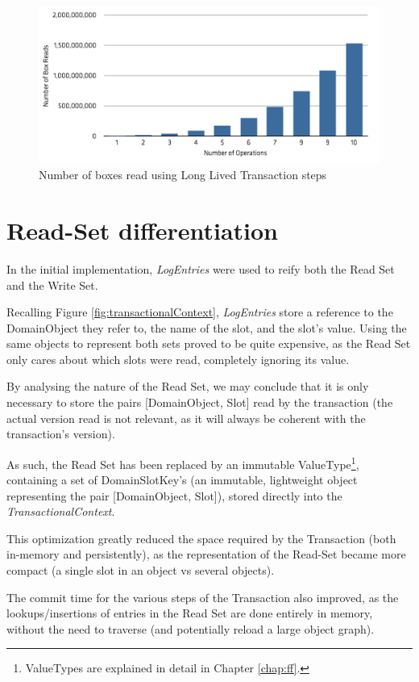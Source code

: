 \begin{figure}
\centering
\includegraphics[width=0.9\linewidth]{box-long-v1}
\caption{Number of boxes read using Long Lived Transaction steps}
\label{fig:long-box-v1}
\end{figure}

\section{Read-Set differentiation}

In the initial implementation, {\it LogEntries} were used to reify
both the Read Set and the Write Set.

Recalling Figure \ref{fig:transactionalContext}, {\it LogEntries} store a
reference to the DomainObject they refer to, the name of the slot, and
the slot's value. Using the same objects to represent both sets proved
to be quite expensive, as the Read Set only cares about which slots
were read, completely ignoring its value.

By analysing the nature of the Read Set, we may conclude that it is
only necessary to store the pairs [DomainObject, Slot] read by the
transaction (the actual version read is not relevant, as it will
always be coherent with the transaction's version).

As such, the Read Set has been replaced by an immutable
ValueType\footnote{ValueTypes are explained in detail in Chapter
  \ref{chap:ff}.}, containing a set of DomainSlotKey's (an immutable,
lightweight object representing the pair [DomainObject, Slot]), stored
directly into the {\it TransactionalContext}.

This optimization greatly reduced the space required by the
Transaction (both in-memory and persistently), as the representation
of the Read-Set became more compact (a single slot in an object vs
several objects).

The commit time for the various steps of the Transaction also
improved, as the lookups/insertions of entries in the Read Set are
done entirely in memory, without the need to traverse (and
potentially reload a large object graph).

